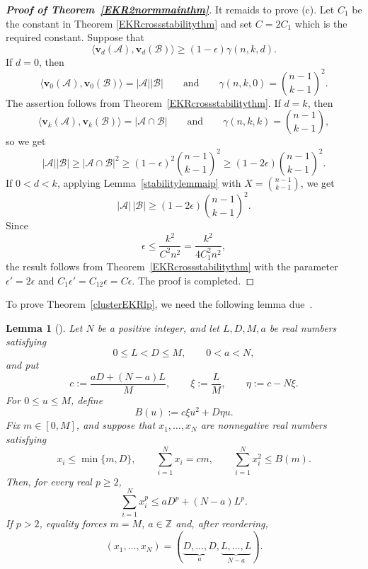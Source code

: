 \documentclass[10pt,a4paper]{amsart}
\numberwithin{equation}{section}
\newtheorem{lemma}[theorem]{Lemma}
\begin{document}
\begin{proof}[{\bf Proof of Theorem~\ref{EKR2normmainthm}}]
It remaids to prove (c).
Let $C_1$ be the constant in Theorem \ref{EKRcrossstabilitythm} and set
$C=2C_1$ which is the required constant.
Suppose that
\[
\big\langle\mathbf{v}_d(\mathcal{A}),
\mathbf{v}_d(\mathcal{B})\big\rangle
\geq(1-\epsilon)\gamma(n,k,d).
\]
If $d=0$, then
\[
  \bigl\langle \mathbf{v}_0(\mathcal A),\mathbf{v}_0(\mathcal B)\bigr\rangle
  =|\mathcal A||\mathcal B|
  \qquad\text{and}\qquad
  \gamma(n,k,0)=\binom{n-1}{k-1}^2.
\]
The assertion follows from Theorem~\ref{EKRcrossstabilitythm}.
If $d=k$, then
\[
  \bigl\langle \mathbf{v}_k(\mathcal A),\mathbf{v}_k(\mathcal B)\bigr\rangle
  =|\mathcal A\cap\mathcal B|
  \qquad\text{and}\qquad
  \gamma(n,k,k)=\binom{n-1}{k-1},
\]
so we get
\[
  |\mathcal A||\mathcal B|
  \geq |\mathcal A\cap\mathcal B|^2
  \geq(1-\epsilon)^2\binom{n-1}{k-1}^2
  \geq(1-2\epsilon)\binom{n-1}{k-1}^2.
\]
If $0<d<k$,
applying Lemma~\ref{stabilitylemmaip} with
$X=\binom{n-1}{k-1}$, we get
\[
|\mathcal{A}|\,|\mathcal{B}|
\geq(1-2\epsilon)\binom{n-1}{k-1}^2.
\]
Since
\[
\epsilon\leq\frac{k^2}{C^2n^2}
=\frac{k^2}{4C_1^2n^2},
\]
the result follows from Theorem~\ref{EKRcrossstabilitythm} with the parameter $\epsilon'=2\epsilon$ and $C_1\epsilon'= C_12\epsilon=C\epsilon$.
The proof is completed.
\end{proof}




To prove
Theorem~\ref{clusterEKRlp}, we need the following lemma due~\cite[Lemma 2.6]{Cao}.





\begin{lemma}[\cite{Cao}]\label{convextransferlem}
Let $N$ be a positive integer, and let $L,D,M,a$ be real numbers
satisfying
\[
0\leq L<D\leq M,
\qquad
0<a<N,
\]
and put
\[
c:=\frac{aD+(N-a)L}{M},
\qquad
\xi:=\frac LM,
\qquad
\eta:=c-N\xi.
\]
For $0\leq u\leq M$, define
\[
 B(u):=c\xi u^2+D\eta u.
\]
Fix $m\in[0,M]$, and suppose that $x_1,\ldots,x_N$ are nonnegative
real numbers satisfying
\begin{equation}\label{eq:abstract-envelope-assumptions}
x_i\leq\min\{m,D\},\qquad
\sum_{i=1}^N x_i=cm,\qquad
\sum_{i=1}^N x_i^2\leq  B(m).
\end{equation}
Then, for every real $p\geq2$,
\begin{equation}\label{eq:abstract-envelope}
\sum_{i=1}^N x_i^p
\leq
aD^p+(N-a)L^p.
\end{equation}
If $p>2$, equality forces $m=M$, $a\in\mathbb Z$ and, after
reordering,
\[
(x_1,\ldots,x_N)
=
(\underbrace{D,\ldots,D}_{a},
\underbrace{L,\ldots,L}_{N-a}).
\]
\end{lemma}
\end{document}
